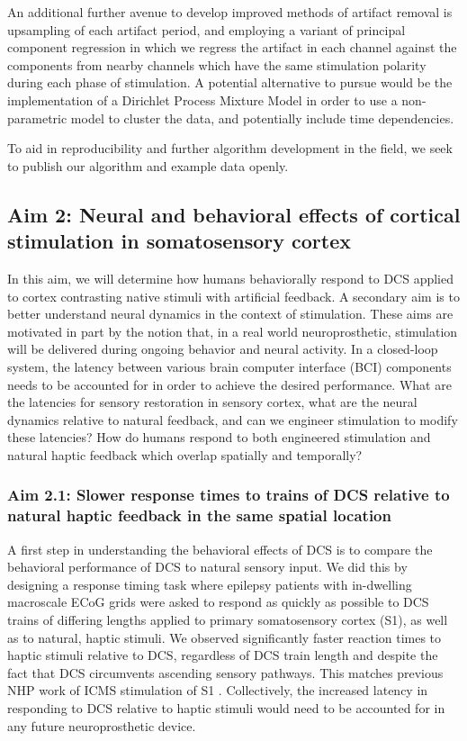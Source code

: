 An additional further avenue to develop improved methods of artifact removal is upsampling of each artifact period, and employing a variant of principal component regression \cite{OShea2017} in which we regress the artifact in each channel against the components from nearby channels which have the same stimulation polarity during each phase of stimulation. A potential alternative to pursue would be the implementation of a Dirichlet Process Mixture Model \cite{WhyeTeh2004,Teh2010} in order to use a non-parametric model to cluster the data, and potentially include time dependencies. 

To aid in reproducibility and further algorithm development in the field, we seek to publish our algorithm and example data openly. 

\subsection{Aim 2: Neural and behavioral effects of cortical stimulation in somatosensory cortex }


In this aim, we will determine how humans behaviorally respond to DCS applied to cortex contrasting native stimuli with artificial feedback. A secondary aim is to better understand neural dynamics in the context of stimulation. These aims are motivated in part by the notion that, in a real world neuroprosthetic, stimulation will be delivered during ongoing behavior and neural activity. In a closed-loop system, the latency between various brain computer interface (BCI) components needs to be accounted for in order to achieve the desired performance. What are the latencies for sensory restoration in sensory cortex, what are the neural dynamics relative to natural feedback, and can we engineer stimulation to modify these latencies? How do humans respond to both engineered stimulation and natural haptic feedback which overlap spatially and temporally? 

\subsubsection{Aim 2.1: Slower response times to trains of DCS relative to natural haptic feedback in the same spatial location}

A first step in understanding the behavioral effects of DCS is to compare the behavioral performance of DCS to natural sensory input. We did this by designing a response timing task where epilepsy patients with in-dwelling macroscale ECoG grids were asked to respond as quickly as possible to DCS trains of differing lengths applied to primary somatosensory cortex (S1), as well as to natural, haptic stimuli. We observed significantly faster reaction times to haptic stimuli relative to DCS, regardless of DCS train length and despite the fact that DCS circumvents ascending sensory pathways. This matches previous NHP work of ICMS stimulation of S1 \cite{Godlove2014a}. Collectively, the increased latency in responding to DCS relative to haptic stimuli would need to be accounted for in any future neuroprosthetic device.

